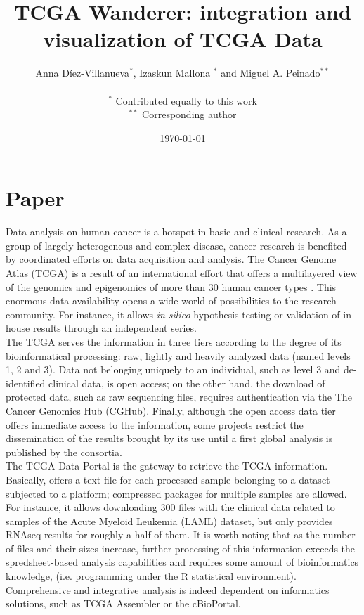 \documentclass{article}
\title{TCGA Wanderer: integration and visualization of TCGA Data}
\author{Anna D{\'i}ez-Villanueva$^*$, Izaskun Mallona $^*$ and Miguel A. Peinado$^{**}$ \\
\\
 $^*$ Contributed equally to this work\\
 $^{**}$ Corresponding author
}
\date{\today}
\begin{document}
\maketitle

\section{Paper}

Data analysis on human cancer is a hotspot in basic and clinical research. As a group of largely heterogenous and complex disease, cancer research is benefited by coordinated efforts on data acquisition and analysis. The Cancer Genome Atlas (TCGA) is a result of an international effort that offers a multilayered view of the genomics and epigenomics of more than 30 human cancer types \cite{weinstein2013cancer}. This enormous data availability opens a wide world of possibilities to the research community. For instance, it allows \textit{in silico} hypothesis testing or validation of in-house results through an independent series.\\

The TCGA serves the information in three tiers according to the degree of its bioinformatical processing: raw, lightly and heavily analyzed data (named levels 1, 2 and 3). Data not belonging uniquely to an individual, such as level 3 and de-identified clinical data, is open access; on the other hand, the download of protected data, such as raw sequencing files, requires authentication via the The Cancer Genomics Hub (CGHub)\cite{wilks2014cancer}. Finally, although the open access data tier offers immediate access to the information, some projects restrict the dissemination of the results brought by its use until a first global analysis is published by the consortia.\\

The TCGA Data Portal is the gateway to retrieve the TCGA information. Basically, offers a text file for each processed sample belonging to a dataset subjected to a platform; compressed packages for multiple samples are allowed. For instance, it allows downloading 300 files with the clinical data related to samples of the Acute Myeloid Leukemia (LAML) dataset, but only provides RNAseq results for roughly a half of them. It is worth noting that as the number of files and their sizes increase, further processing of this information exceeds the spredsheet-based analysis capabilities and requires some amount of bioinformatics knowledge, (i.e. programming under the R statistical environment). Comprehensive and integrative analysis is indeed dependent on informatics solutions, such as TCGA Assembler \cite{zhu2014tcga} or the cBioPortal\cite{gao2013integrative}.\\
\end{document}
